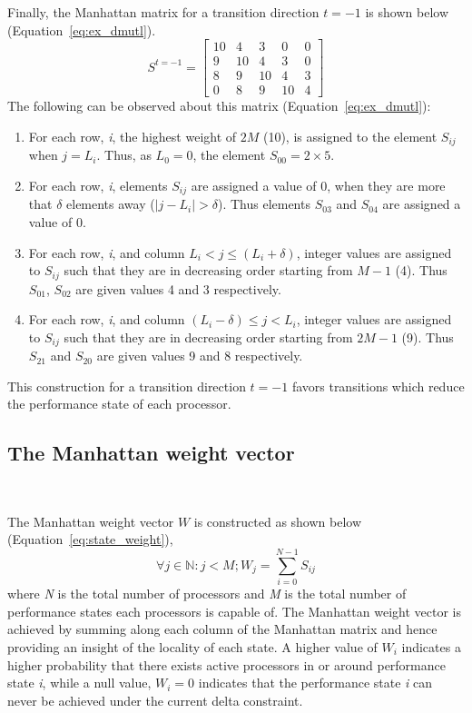 Finally, the Manhattan matrix for a transition direction $t = -1$ is shown below (Equation~\eqref{eq:ex_dmutl}).
\begin{equation}
    S^{t = -1} = \left[
     \begin{array}{ccccc}
       10 & 4 & 3 & 0 & 0 \\
       9 & 10 & 4 & 3 & 0 \\
       8 & 9 & 10 & 4 & 3 \\
       0 & 8 & 9 & 10 & 4
     \end{array}
   \right]
\label{eq:ex_dmutl}
\end{equation}
The following can be observed about this matrix (Equation~\eqref{eq:ex_dmutl}):
\begin{enumerate}
\item For each row, \textit{i}, the highest weight of $2M$ (10), is assigned to the element $S_{ij}$ when $j = L_i$. Thus, as $L_0 = 0$, the element $S_{00} = 2 \times 5$.
\item For each row, \textit{i}, elements $S_{ij}$ are assigned a value of 0, when they are more that $\delta$ elements away ($|j - L_i| > \delta$). Thus elements $S_{03}$ and $S_{04}$
are assigned a value of 0.
\item For each row, \textit{i}, and column $L_i < j \leq (L_i + \delta)$, integer values are assigned to $S_{ij}$ such that they are in decreasing order starting from $M-1$ (4).
Thus $S_{01}$, $S_{02}$ are given values 4 and 3 respectively. 
\item For each row, \textit{i}, and column $(L_i - \delta) \leq j < L_i$, integer values are assigned to $S_{ij}$ such that they are in decreasing order starting from $2M-1$ (9).
Thus $S_{21}$ and $S_{20}$ are given values 9 and 8 respectively.
\end{enumerate}
This construction for a transition direction $t = -1$ favors transitions which reduce the performance state of each processor. 


\subsection{The Manhattan weight vector}~\label{sec:weight}

The Manhattan weight vector $W$ is constructed as shown below (Equation~\ref{eq:state_weight}),
\begin{equation}
    \forall j \in \mathbb{N} : j < M; W_j = \displaystyle\sum_{i=0}^{N-1} {S_{ij}}
\label{eq:state_weight}
\end{equation}
where \textit{N} is the total number of processors and \textit{M} is the total number of
performance states each processors is capable of.
The Manhattan weight vector is achieved by summing along each column 
of the Manhattan matrix and hence providing an insight of the locality of each state. A higher value of $W_i$ 
indicates a higher probability that there exists active processors in or around
performance state \textit{i}, while a null value, $W_i = 0$ indicates that the performance state \textit{i}
can never be achieved under the current delta constraint. 


